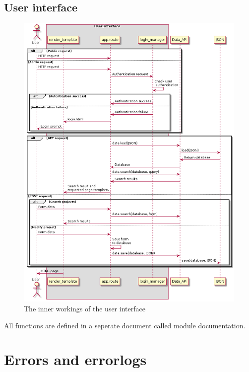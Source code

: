\documentclass{TDP003mall}
\begin{document}
\subsection{User interface}
\begin{figure}[h!]
    \centering
    \includegraphics[width=14cm]{sekvensdiagram2-3.png}
    \caption{The inner workings of the user interface}
    \label{sekvensdiagram2}
\end{figure}
All functions are defined in a seperate document called module documentation.

\newpage
\section{Errors and errorlogs}
\end{document}
